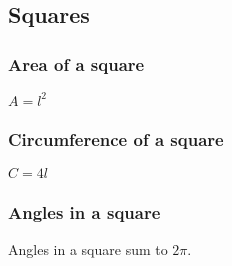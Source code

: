 
\subsection{Squares}

\subsubsection{Area of a square}

\(A=l^2\)

\subsubsection{Circumference of a square}

\(C=4l\)

\subsubsection{Angles in a square}

Angles in a square sum to \(2\pi \).

